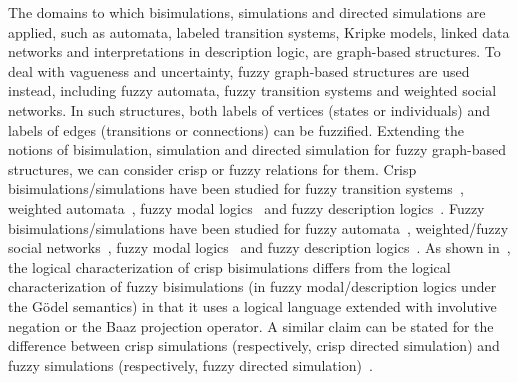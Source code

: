 \documentclass[11pt]{article}
\begin{document}
The domains to which bisimulations, simulations and directed simulations are applied, such as automata, labeled transition systems, Kripke models, linked data networks and interpretations in description logic, are graph-based structures. To deal with vagueness and uncertainty, fuzzy graph-based structures are used instead, including fuzzy automata, fuzzy transition systems and weighted social networks.
In such structures, both labels of vertices (states or individuals) and labels of edges (transitions or connections) can be fuzzified. 
%
Extending the notions of bisimulation, simulation and directed simulation for fuzzy graph-based structures, we can consider crisp or fuzzy relations for them. Crisp bisimulations/simulations have been studied for fuzzy transition systems~\cite{CaoCK11,DBLP:journals/fss/WuD16,CaoSWC13,DBLP:journals/fss/WuCBD18}, weighted automata~\cite{StanimirovicSC2019}, fuzzy modal logics~\cite{Fan15} and fuzzy description logics~\cite{Nguyen-TFS2019,jBSfDL2}. Fuzzy bisimulations/simulations have been studied for fuzzy automata~\cite{CiricIDB12,CiricIJD12,MicicJS18}, weighted/fuzzy social networks~\cite{ai/FanL14,IgnjatovicCS15}, fuzzy modal logics~\cite{Fan15} and fuzzy description logics~\cite{jBSfDL2,minimization-by-fBS,TFS2020}. 
%
As shown in~\cite{Fan15,jBSfDL2}, the logical characterization of crisp bisimulations differs from the logical characterization of fuzzy bisimulations (in fuzzy modal/description logics under the G\"odel semantics) in that it uses a logical language extended with involutive negation or the Baaz projection operator. A similar claim can be stated for the difference between crisp simulations (respectively, crisp directed simulation) and fuzzy simulations (respectively, fuzzy directed simulation)~\cite{jBSfDL3}. 
\end{document}
